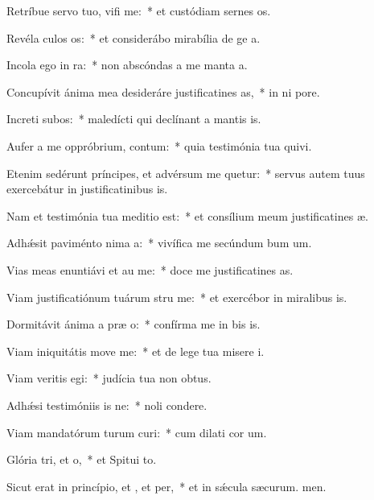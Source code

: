 \item Retríbue servo tuo, vifi me:~* et custódiam sernes os.
\item Revéla culos os:~* et considerábo mirabília de ge a.
\item Incola ego  in ra:~* non abscóndas a me manta a.
\item Concupívit ánima mea desideráre justificatines as,~* in ni pore.
\item Increti subos:~* maledícti qui declínant a mantis is.
\item Aufer a me oppróbrium,  contum:~* quia testimónia tua quivi.
\item Etenim sedérunt príncipes, et advérsum me quetur:~* servus autem tuus exercebátur in justificatinibus is.
\item Nam et testimónia tua meditio  est:~* et consílium meum justificatines æ.
\item Adhǽsit paviménto nima a:~* vivífica me secúndum bum um.
\item Vias meas enuntiávi et au me:~* doce me justificatines as.
\item Viam justificatiónum tuárum stru me:~* et exercébor in miralibus is.
\item Dormitávit ánima a præ o:~* confírma me in bis is.
\item Viam iniquitátis move  me:~* et de lege tua misere i.
\item Viam veritis egi:~* judícia tua non  obtus.
\item Adhǽsi testimóniis is ne:~* noli  condere.
\item Viam mandatórum turum curi:~* cum dilati cor um.
\item Glória tri, et o,~* et Spitui to.
\item Sicut erat in princípio, et , et per,~* et in sǽcula sæcurum. men.
